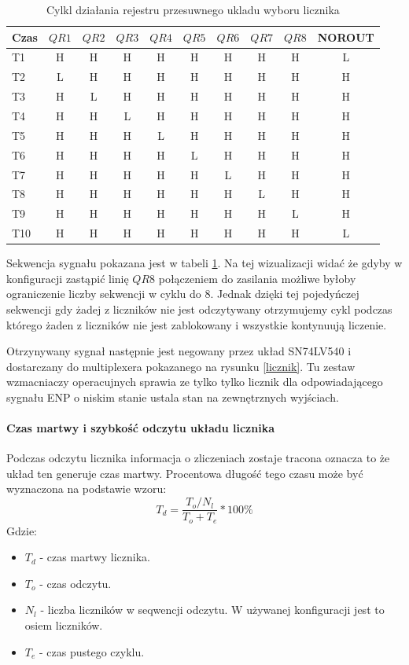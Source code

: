 \documentclass[a4paper,12pt]{article}
\begin{document}
\begin{table}
        \centering
        \caption{Cylkl działania rejestru przesuwnego ukladu wyboru licznika}
        \label{shift sygnal}
        \begin{tabular}{lccccccccc}
                Czas &$QR1$&$QR2$&$QR3$&$QR4$&$QR5$&$QR6$&$QR7$&$QR8$  &NOROUT\\ \hline     
                T1&H&H&H&H&H&H&H&H &L\\
                T2&L&H&H&H&H&H&H&H &H\\
                T3&H&L&H&H&H&H&H&H &H\\
                T4&H&H&L&H&H&H&H&H &H\\
                T5&H&H&H&L&H&H&H&H &H\\
                T6&H&H&H&H&L&H&H&H &H\\
                T7&H&H&H&H&H&L&H&H &H\\
                T8&H&H&H&H&H&H&L&H &H\\
                T9&H&H&H&H&H&H&H&L &H\\
                T10&H&H&H&H&H&H&H&H &L\\
        \end{tabular}
\end{table}

Sekwencja sygnału pokazana jest w tabeli \ref{shift sygnal}. Na tej wizualizacji widać że gdyby w konfiguracji zastąpić linię $QR8$ połączeniem do zasilania możliwe byłoby ograniczenie liczby sekwencji w cyklu do 8. Jednak dzięki tej pojedyńczej sekwencji gdy żadej z liczników nie jest odczytywany otrzymujemy cykl podczas którego żaden z liczników nie jest zablokowany i wszystkie kontynuują liczenie. 

Otrzynywany sygnał następnie jest negowany przez układ SN74LV540 i dostarczany do multiplexera pokazanego na rysunku \ref{licznik}.
Tu zestaw wzmacniaczy operacujnych sprawia ze tylko tylko licznik dla odpowiadającego sygnału ENP o niskim stanie ustala stan na zewnętrznych wyjściach. 

\paragraph{Czas martwy i szybkość odczytu układu licznika}
Podczas odczytu licznika informacja o zliczeniach zostaje tracona oznacza to że układ ten generuje czas martwy. 
Procentowa długość tego czasu może być wyznaczona na podstawie wzoru:
\begin{equation}
        T_d = \frac{T_o/N_l}{T_o+T_e} * 100\%
\end{equation}
Gdzie:
\begin{itemize}
        \item $T_d$ - czas martwy licznika.
        \item $T_o$ - czas odczytu.
        \item $N_l$ - liczba liczników w seqwencji odczytu. W używanej konfiguracji jest to osiem liczników. 
        \item $T_e$ - czas pustego czyklu.
\end{itemize}
\end{document}
